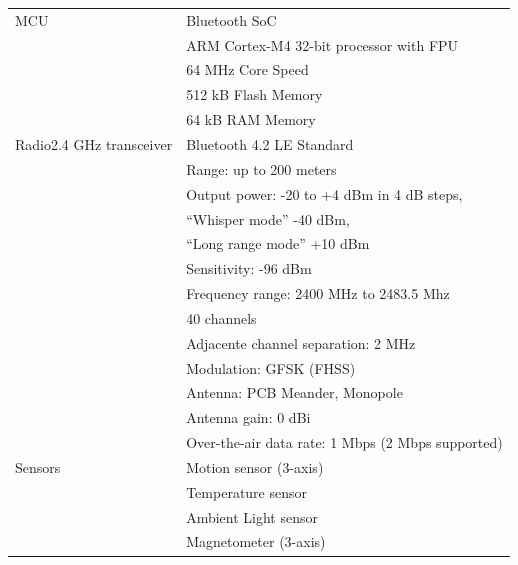 \documentclass[
	12pt,				%
	openright,			%
	twoside,			%
	a4paper,			%
	english,			%
	french,				%
	spanish,			%
	brazil				%
	]{abntex2}
\begin{document}
\begin{table}[h!]
    \centering
    \begin{tabular}{ | l | l | } 
        \hline
        MCU                             & Bluetooth SoC \\
                                        & ARM Cortex-M4 32-bit processor with FPU \\
                                        & 64 MHz Core Speed \\
                                        & 512 kB Flash Memory \\
                                        & 64 kB RAM Memory \\
        \hline
        Radio2.4 GHz transceiver        & Bluetooth 4.2 LE Standard \\
                                        & Range: up to 200 meters \\
                                        & Output power: -20 to +4 dBm in 4 dB steps, \\
                                        & ``Whisper mode'' -40 dBm, \\
                                        & ``Long range mode'' +10 dBm \\
                                        & Sensitivity: -96 dBm \\
                                        & Frequency range: 2400 MHz to 2483.5 Mhz \\
                                        & 40 channels \\
                                        & Adjacente channel separation: 2 MHz \\
                                        & Modulation: GFSK (FHSS) \\
                                        & Antenna: PCB Meander, Monopole \\
                                        & Antenna gain: 0 dBi \\
                                        & Over-the-air data rate: 1 Mbps (2 Mbps supported) \\
        \hline
        Sensors                         & Motion sensor (3-axis) \\
                                        & Temperature sensor \\
                                        & Ambient Light sensor \\
                                        & Magnetometer (3-axis) \\

\end{tabular}
\end{table}
\end{document}
